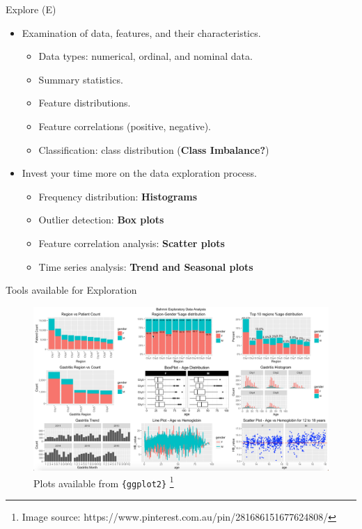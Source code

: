 \documentclass[12pt,ignorenonframetext,]{beamer}
\providecommand{\tightlist}{%
  \setlength{\itemsep}{0pt}\setlength{\parskip}{0pt}}
\begin{document}
\begin{frame}{Explore (E)}
\protect\hypertarget{explore-e}{}

\begin{itemize}
\tightlist
\item
  Examination of data, features, and their characteristics. \vspace{2mm}

  \begin{itemize}
      \item Data types: numerical, ordinal, and nominal data.
      \item Summary statistics.
      \item Feature distributions.
      \item Feature correlations (positive, negative).
      \item Classification: class distribution (\textbf{Class Imbalance?})
  \end{itemize}
   \vspace{2mm}
\item
  Invest your time more on the data exploration process.

  \begin{itemize}
      \item Frequency distribution: \textbf{Histograms}
      \item Outlier detection: \textbf{Box plots}
      \item Feature correlation analysis: \textbf{Scatter plots}
      \item Time series analysis: \textbf{Trend and Seasonal plots}
  \end{itemize}
\end{itemize}

\end{frame}

\begin{frame}{Tools available for Exploration}
\protect\hypertarget{tools-available-for-exploration}{}

\begin{figure}
  \includegraphics[width=.9\textwidth,height=.9\textheight,keepaspectratio]{images/data_exploration.png}
  \caption{Plots available from \texttt{\{ggplot2\}}%
    \footnote{%
     \tiny{Image source: https://www.pinterest.com.au/pin/281686151677624808/}
    }%
  }
\end{figure}

\end{frame}
\end{document}
